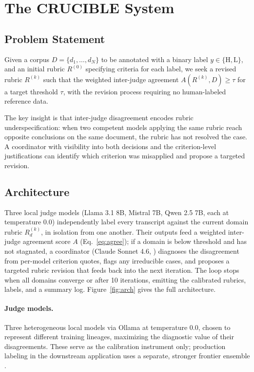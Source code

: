 \documentclass[letterpaper]{article}
\begin{document}
\section{The CRUCIBLE System}

\subsection{Problem Statement}

Given a corpus $D = \{d_1,\dots,d_N\}$ to be annotated with a binary label
$y \in \{\mathrm{H},\mathrm{L}\}$, and an initial rubric $R^{(0)}$ specifying
criteria for each label, we seek a revised rubric $R^{(k)}$ such that the
weighted inter-judge agreement $A(R^{(k)}, D) \geq \tau$ for a target
threshold $\tau$, with the revision process requiring no human-labeled
reference data.

The key insight is that inter-judge disagreement encodes rubric
underspecification: when two competent models applying the same rubric reach
opposite conclusions on the same document, the rubric has not resolved the
case. A coordinator with visibility into both decisions and the
criterion-level justifications can identify which criterion was misapplied
and propose a targeted revision.

\subsection{Architecture}

Three local judge models (Llama 3.1 8B, Mistral 7B, Qwen 2.5 7B, each at
temperature 0.0) independently label every transcript against the current
domain rubric $R^{(k)}_d$, in isolation from one another. Their outputs feed
a weighted inter-judge agreement score $A$ (Eq.~\ref{eq:agree}); if a domain
is below threshold and has not stagnated, a coordinator (Claude Sonnet 4.6,
\citealp{anthropic2026sonnet46}) diagnoses the disagreement from per-model
criterion quotes, flags any irreducible cases, and proposes a targeted rubric
revision that feeds back into the next iteration. The loop stops when all
domains converge or after 10 iterations, emitting the calibrated rubrics,
labels, and a summary log. Figure~\ref{fig:arch} gives the full architecture.

\paragraph{Judge models.}
Three heterogeneous local models via Ollama at temperature 0.0, chosen to
represent different training lineages, maximizing the diagnostic value of
their disagreements. These serve as the calibration instrument only;
production labeling in the downstream application uses a separate, stronger
frontier ensemble \citep{das2026snr}.
\end{document}
